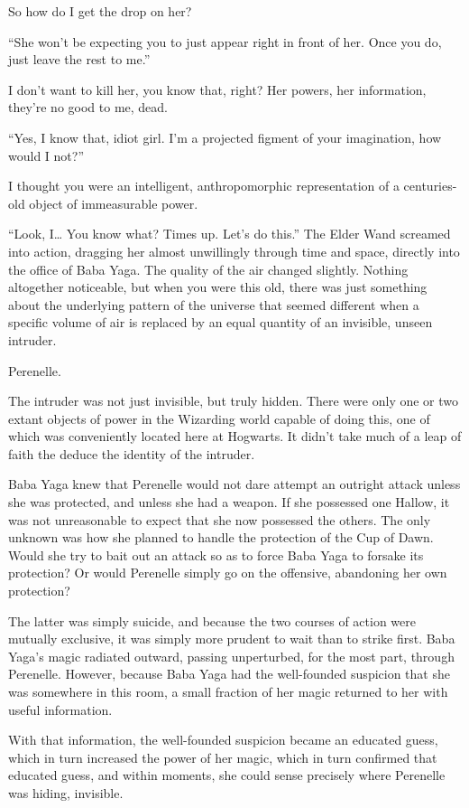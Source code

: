 So how do I get the drop on her?

“She won’t be expecting you to just appear right in front of her. Once you do, just leave the rest to me.”

I don’t want to kill her, you know that, right? Her powers, her information, they’re no good to me, dead.

“Yes, I know that, idiot girl. I’m a projected figment of your imagination, how would I not?”

I thought you were an intelligent, anthropomorphic representation of a centuries-old object of immeasurable power.

“Look, I… You know what? Times up. Let’s do this.” The Elder Wand screamed into action, dragging her almost unwillingly through time and space, directly into the office of Baba Yaga.
\simpleline
The quality of the air changed slightly. Nothing altogether noticeable, but when you were this old, there was just something about the underlying pattern of the universe that seemed different when a specific volume of air is replaced by an equal quantity of an invisible, unseen intruder.

Perenelle.

The intruder was not just invisible, but truly hidden. There were only one or two extant objects of power in the Wizarding world capable of doing this, one of which was conveniently located here at Hogwarts. It didn’t take much of a leap of faith the deduce the identity of the intruder.

Baba Yaga knew that Perenelle would not dare attempt an outright attack unless she was protected, and unless she had a weapon. If she possessed one Hallow, it was not unreasonable to expect that she now possessed the others. The only unknown was how she planned to handle the protection of the Cup of Dawn. Would she try to bait out an attack so as to force Baba Yaga to forsake its protection? Or would Perenelle simply go on the offensive, abandoning her own protection?

The latter was simply suicide, and because the two courses of action were mutually exclusive, it was simply more prudent to wait than to strike first. Baba Yaga’s magic radiated outward, passing unperturbed, for the most part, through Perenelle. However, because Baba Yaga had the well-founded suspicion that she was somewhere in this room, a small fraction of her magic returned to her with useful information.

With that information, the well-founded suspicion became an educated guess, which in turn increased the power of her magic, which in turn confirmed that educated guess, and within moments, she could sense precisely where Perenelle was hiding, invisible.

